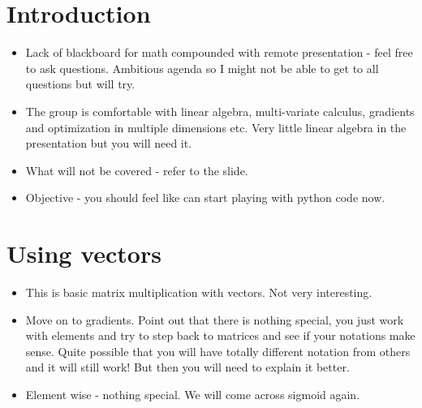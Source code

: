 \documentclass[14pt, twocolumn]{article}
\title{}
\author{}
\begin{document}
\maketitle


\section*{Introduction}
\begin{itemize}
	\item Lack of blackboard for math compounded with remote presentation - feel free to ask 
	questions. Ambitious agenda so I might not be able to get to all questions but will try. 
	\item  The group is comfortable with linear algebra, multi-variate calculus, gradients 
	and optimization in multiple dimensions etc. Very little linear algebra in the presentation 
	but you will need it. 
	\item What will not be covered - refer to the slide. 
	\item Objective - you should feel like can start playing with python code now.
\end{itemize}
\section*{Using vectors}
\begin{itemize}
	\item This is basic matrix multiplication with vectors. Not very interesting. 
	\item Move on to gradients. Point out that there is nothing special, you just 
	work with elements and try to step back to matrices and see if your notations 
	make sense. Quite possible that you will have totally different notation from 
	others and it will still work! But then you will need to explain it better.
	\item Element wise - nothing special. We will come across sigmoid again. 
\end{itemize}
\end{document}
